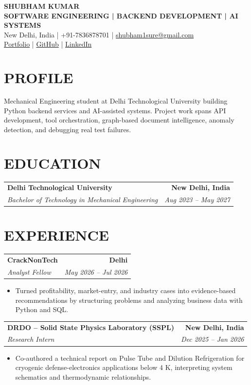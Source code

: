 \documentclass[10pt,a4paper]{article}
\makeatletter
\newcommand{\resumeSubheading}[4]{%
  \begin{tabular*}{\textwidth}{@{}l@{\extracolsep{\fill}}r@{}}
    \textbf{#1} & \textbf{#2} \\
    \textit{#3} & \textit{#4}
  \end{tabular*}\vspace{-3pt}
}
\makeatother
\begin{document}
\begin{center}
  {\LARGE\bfseries SHUBHAM KUMAR}\\[2pt]
  {\small\bfseries SOFTWARE ENGINEERING \;|\; BACKEND DEVELOPMENT \;|\; AI SYSTEMS}\\[2pt]
  New Delhi, India \;|\; +91-7836878701 \;|\;
  \href{mailto:shubham1sure@gmail.com}{shubham1sure@gmail.com}\\[2pt]
  \href{https://nothing0g.github.io/analyst/}{Portfolio}
  \;|\;
  \href{https://github.com/Nothing0g}{GitHub}
  \;|\;
  \href{https://www.linkedin.com/in/shubham-kumar-diff/}{LinkedIn}
\end{center}

\vspace{-8pt}

\section*{PROFILE}
Mechanical Engineering student at Delhi Technological University building Python backend services and AI-assisted systems. Project work spans API development, tool orchestration, graph-based document intelligence, anomaly detection, and debugging real test failures.

\section*{EDUCATION}
\resumeSubheading
  {Delhi Technological University}{New Delhi, India}
  {Bachelor of Technology in Mechanical Engineering}{Aug 2023 -- May 2027}

\section*{EXPERIENCE}

\resumeSubheading
  {CrackNonTech}{Delhi}
  {Analyst Fellow}{May 2026 -- Jul 2026}
\begin{itemize}
  \item Turned profitability, market-entry, and industry cases into evidence-based recommendations by structuring problems and analyzing business data with Python and SQL.
\end{itemize}

\resumeSubheading
  {DRDO -- Solid State Physics Laboratory (SSPL)}{New Delhi, India}
  {Research Intern}{Dec 2025 -- Jan 2026}
\begin{itemize}
  \item Co-authored a technical report on Pulse Tube and Dilution Refrigeration for cryogenic defense-electronics applications below 4 K, interpreting system schematics and thermodynamic relationships.
\end{itemize}
\end{document}
